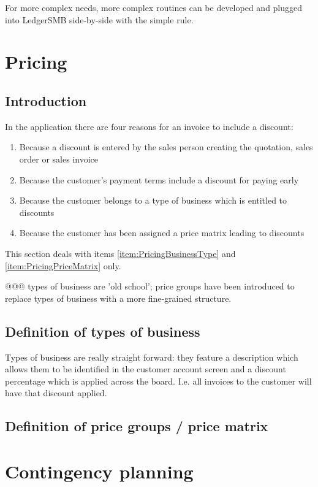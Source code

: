 For more complex needs, more complex routines can be developed and plugged into
LedgerSMB side-by-side with the simple rule.

\chapter{Pricing}

\section{Introduction}

In the application there are four reasons for an invoice to include a discount:

\begin{enumerate}
\item Because a discount is entered by the sales person creating the quotation,
  sales order or sales invoice
\item Because the customer's payment terms include a discount for paying early
\item Because the customer belongs to a type of business which is entitled to discounts
\label{item:PricingBusinessType}
\item Because the customer has been assigned a price matrix leading to discounts
\label{item:PricingPriceMatrix}
\end{enumerate}

This section deals with items \ref{item:PricingBusinessType} and \ref{item:PricingPriceMatrix} only.

@@@ types of business are 'old school'; price groups have been introduced to replace types of business with a more fine-grained structure.

\section{Definition of types of business}

Types of business are really straight forward: they feature a description
which allows them to be identified in the customer account screen and a discount
percentage which is applied across the board. I.e. all invoices to the customer
will have that discount applied.

\section{Definition of price groups / price matrix}

\chapter{Contingency planning}

